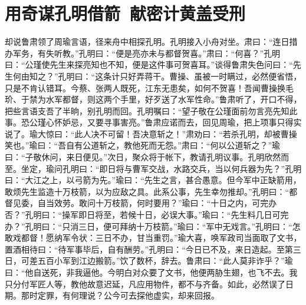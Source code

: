 \chapter{用奇谋孔明借箭~献密计黄盖受刑}

却说鲁肃领了周瑜言语，径来舟中相探孔明。孔明接入小舟对坐。肃曰：“连日措办军务，有失听教。”孔明曰：“便是亮亦未与都督贺喜。”肃曰：“何喜？”孔明曰：“公瑾使先生来探亮知也不知，便是这件事可贺喜耳。”谈得鲁肃失色问曰：“先生何由知之？”孔明曰：“这条计只好弄蒋干。曹操、虽被一时瞒过，必然便省悟，只是不肯认错耳。今蔡、张两人既死，江东无患矣，如何不贺喜！吾闻曹操换毛玠、于禁为水军都督，则这两个手里，好歹送了水军性命。”鲁肃听了，开口不得，把些言语支吾了半晌，别孔明而回。孔明嘱曰：“望子敬在公瑾面前勿言亮先知此事。恐公瑾心怀妒忌，又要寻事害亮。”鲁肃应诺而去，回见周瑜，把上项事只得实说了。瑜大惊曰：“此人决不可留！吾决意斩之！”肃劝曰：“若杀孔明，却被曹操笑也。”瑜曰：“吾自有公道斩之，教他死而无怨。”肃曰：“何以公道斩之？”瑜曰：“子敬休问，来日便见。”次日，聚众将于帐下，教请孔明议事。孔明欣然而至。坐定，瑜问孔明曰：“即日将与曹军交战，水路交兵，当以何兵器为先？”孔明曰：“大江之上，以弓箭为先。”瑜曰：“先生之言，甚合愚意。但今军中正缺箭用，敢烦先生监造十万枝箭，以为应敌之具。此系公事，先生幸勿推却。”孔明曰：“都督见委，自当效劳。敢问十万枝箭，何时要用？”瑜曰：“十日之内，可完办否？”孔明曰：“操军即日将至，若候十日，必误大事。”瑜曰：“先生料几日可完办？”孔明曰：“只消三日，便可拜纳十万枝箭。”瑜曰：“军中无戏言。”孔明曰：“怎敢戏都督！愿纳军令状：三日不办，甘当重罚。”瑜大喜，唤军政司当面取了文书，置酒相待曰：“待军事毕后，自有酬劳。”孔明曰：“今日已不及，来日造起。至第三日，可差五百小军到江边搬箭。”饮了数杯，辞去。鲁肃曰：“此人莫非诈乎？”瑜曰：“他自送死，非我逼他。今明白对众要了文书，他便两胁生翅，也飞不去。我只分付军匠人等，教他故意迟延，凡应用物件，都不与齐备。如此，必然误了日期。那时定罪，有何理说？公今可去探他虚实，却来回报。

